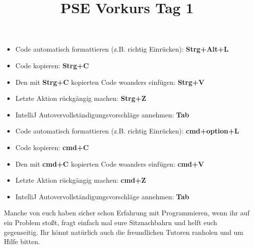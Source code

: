 \documentclass{../../sheet}
\title{PSE Vorkurs Tag 1}
\begin{document}
\maketitle

\begin{itemize}
    \item Code automatisch formattieren (z.B. richtig Einrücken): \textbf{Strg+Alt+L}
    \item Code kopieren: \textbf{Strg+C}
    \item Den mit \textbf{Strg+C} kopierten Code woanders einfügen: \textbf{Strg+V}
    \item Letzte Aktion rückgängig machen: \textbf{Strg+Z}
    \item IntelliJ Autovervollständigungsvorschläge annehmen: \textbf{Tab}
\end{itemize}

\begin{itemize}
    \item Code automatisch formattieren (z.B. richtig Einrücken): \textbf{cmd+option+L}
    \item Code kopieren: \textbf{cmd+C}
    \item Den mit \textbf{cmd+C} kopierten Code woanders einfügen: \textbf{cmd+V}
    \item Letzte Aktion rückgängig machen: \textbf{cmd+Z}
    \item IntelliJ Autovervollständigungsvorschläge annehmen: \textbf{Tab}
\end{itemize}

Manche von euch haben sicher schon Erfahrung mit Programmieren, wenn ihr auf ein Problem stoßt, fragt einfach mal eure Sitznachbahrn und helft euch gegenseitig. Ihr könnt natürlich auch die freundlichen Tutoren ranholen und um Hilfe bitten.
\newpage
\end{document}
